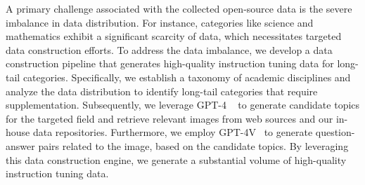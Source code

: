 A primary challenge associated with the collected open-source data is the severe imbalance in data distribution.  For instance, categories like science and mathematics exhibit a significant scarcity of data, which necessitates targeted data construction efforts. To address the data imbalance, we develop a data construction pipeline that generates high-quality instruction tuning data for long-tail categories. Specifically, we establish a taxonomy of academic disciplines and analyze the data distribution to identify long-tail categories that require supplementation. Subsequently, we leverage GPT-4 ~\cite{openai2023gpt4}  to generate candidate topics for the targeted field and retrieve relevant images from web sources and our in-house data repositories. Furthermore, we employ GPT-4V~\cite{GPT4VisionSystemCard} to generate question-answer pairs related to the image, based on the candidate topics.  By leveraging this data construction engine, we generate a substantial volume of high-quality instruction tuning data.




